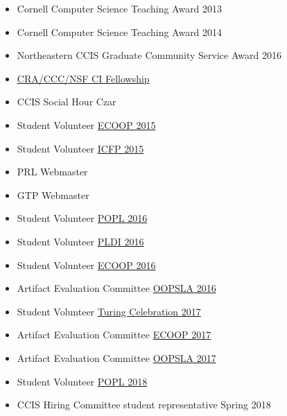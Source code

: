 \documentclass{article}
\begin{document}
\begin{itemize}
  \item {Cornell Computer Science Teaching Award} \hfill 2013
  \item {Cornell Computer Science Teaching Award} \hfill 2014
  \item {Northeastern CCIS Graduate Community Service Award} \hfill 2016
  \item \href{https://cifellows2020.org}{{CRA/CCC/NSF CI Fellowship}} \hfill {}
\end{itemize}


\begin{itemize}
  \item {CCIS Social Hour Czar} \hfill {}
  \item {Student Volunteer} \hfill \href{http://2015.ecoop.org/}{ECOOP 2015}
  \item {Student Volunteer} \hfill \href{http://icfpconference.org/icfp2015/}{ICFP 2015}
  \item {PRL Webmaster} \hfill \href{https://github.com/nuprl/website}{}
  \item {GTP Webmaster} \hfill \href{https://github.com/nuprl/gtp.github.io}{}
  \item {Student Volunteer} \hfill \href{http://conf.researchr.org/home/POPL-2016}{POPL 2016}
  \item {Student Volunteer} \hfill \href{http://conf.researchr.org/home/PLDI-2016}{PLDI 2016}
  \item {Student Volunteer} \hfill \href{http://2016.ecoop.org/}{ECOOP 2016}
  \item {Artifact Evaluation Committee} \hfill \href{http://2016.splashcon.org/track/splash-2016-artifacts}{OOPSLA 2016}
  \item {Student Volunteer} \hfill \href{https://www.acm.org/turing-award-50/conference}{Turing Celebration 2017}
  \item {Artifact Evaluation Committee} \hfill \href{https://2017.ecoop.org/track/ecoop-2017-Artifacts}{ECOOP 2017}
  \item {Artifact Evaluation Committee} \hfill \href{https://2017.splashcon.org/track/splash-2017-OOPSLA-Artifacts}{OOPSLA 2017}
  \item {Student Volunteer} \hfill \href{http://conf.researchr.org/home/POPL-2018}{POPL 2018}
  \item {CCIS Hiring Committee student representative} \hfill {Spring 2018}

\end{itemize}
\end{document}
